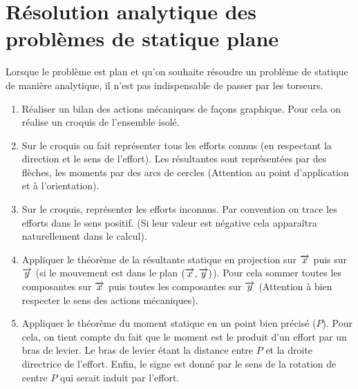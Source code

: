 \documentclass[11pt,oneside]{article}
\begin{document}
\section{Résolution analytique des problèmes de statique plane}

\begin{methode}
Lorsque le problème est plan et qu'on souhaite résoudre un problème de statique de manière analytique, il n'est pas indispensable de passer par les torseurs. 

\begin{enumerate}
\item Réaliser un bilan des actions mécaniques de façons graphique. Pour cela on réalise un croquis de l'ensemble isolé. 
\item Sur le croquis on fait représenter tous les efforts connus (en respectant la direction et le sens de l'effort). Les résultantes sont représentées par des flèches, les moments par des arcs de cercles (Attention au point d'application et à l'orientation).
\item Sur le croquis, représenter les efforts inconnus. Par convention on trace les efforts dans le sens positif. (Si leur valeur est négative cela apparaîtra naturellement dans le calcul).
\item Appliquer le théorème de la résultante statique en projection sur $\overrightarrow{x}$ puis sur $\overrightarrow{y}$ (si le mouvement est dans le plan $\left(\overrightarrow{x},\overrightarrow{y}\right)$). Pour cela sommer toutes les composantes sur $\overrightarrow{x}$ puis toutes les composantes sur $\overrightarrow{y}$ (Attention à bien respecter le sens des actions mécaniques).
\item Appliquer le théorème du moment statique en un point bien précisé ($P$). Pour cela, on tient compte du fait que le moment est le produit d'un effort par un bras de levier. Le bras de levier étant la distance entre $P$ et la droite directrice de l'effort. Enfin, le signe est donné par le sens de la rotation de centre $P$ qui serait induit par l'effort. 
\end{enumerate}
\end{methode}
\end{document}
